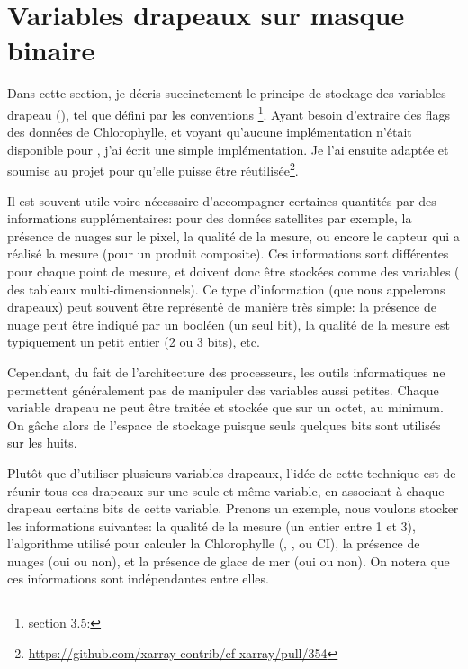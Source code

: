 

\chapter{Variables drapeaux sur masque binaire}
\label{ax:cf-flags}

Dans cette section, je décris succinctement le principe de stockage des variables drapeau (), tel que défini par les conventions \footnote{%
  section 3.5:\par\noindent{}
}.
Ayant besoin d'extraire des flags des données de Chlorophylle, et voyant qu'aucune implémentation n'était disponible pour , j'ai écrit une simple implémentation.
Je l'ai ensuite adaptée et soumise au projet  pour qu'elle puisse être réutilisée\footnote{%
  \url{https://github.com/xarray-contrib/cf-xarray/pull/354}}.

Il est souvent utile voire nécessaire d'accompagner certaines quantités par des informations supplémentaires: pour des données satellites par exemple, la présence de nuages sur le pixel, la qualité de la mesure, ou encore le capteur qui a réalisé la mesure (pour un produit composite).
Ces informations sont différentes pour chaque point de mesure, et doivent donc être stockées comme des variables ( des tableaux multi-dimensionnels).
Ce type d'information (que nous appelerons drapeaux) peut souvent être représenté de manière très simple: la présence de nuage peut être indiqué par un booléen (un seul bit), la qualité de la mesure est typiquement un petit entier (2 ou 3 bits), etc.

Cependant, du fait de l'architecture des processeurs, les outils informatiques ne permettent généralement pas de manipuler des variables aussi petites.
Chaque variable drapeau ne peut être traitée et stockée que sur un octet, au minimum.
On gâche alors de l'espace de stockage puisque seuls quelques bits sont utilisés sur les huits.

Plutôt que d'utiliser plusieurs variables drapeaux, l'idée de cette technique est de réunir tous ces drapeaux sur une seule et même variable, en associant à chaque drapeau certains bits de cette variable.
Prenons un exemple, nous voulons stocker les informations suivantes: la qualité de la mesure (un entier entre 1 et 3), l'algorithme utilisé pour calculer la Chlorophylle (, , ou CI), la présence de nuages (oui ou non), et la présence de glace de mer (oui ou non).
On notera que ces informations sont indépendantes entre elles.

